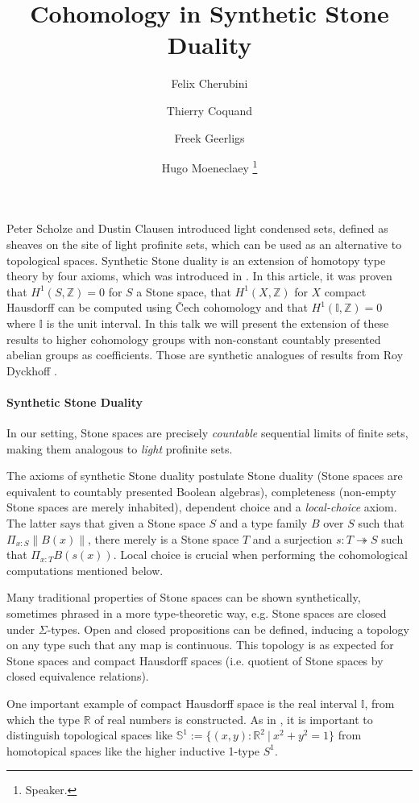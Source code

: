 \documentclass[letterpaper]{../util/easychair}
\title{Cohomology in Synthetic Stone Duality 
}
\author{
Felix Cherubini %
\and 
 Thierry Coquand%
\and 
 Freek Geerligs%
\and
 Hugo Moeneclaey %
\thanks{Speaker.}%
}
\institute{
  University of Gothenburg and Chalmers University of Technology, Gothenburg, Sweden%
}
\newcommand{\R}{\mathbb{R}}
\newcommand{\Z}{\mathbb{Z}}
\newcommand{\I}{\mathbb{I}}
\newcommand{\bS}{\mathbb{S}}
\begin{document}
\maketitle
Peter Scholze and Dustin Clausen \cite{Scholze} introduced light condensed sets, defined as sheaves on the site of light profinite sets, which can be used as an alternative to topological spaces. 
Synthetic Stone duality is an extension of homotopy type theory by four axioms, which was introduced in \cite{synthetic-stone-duality}. In this article, it was proven that $H^1(S,\Z) = 0$ for $S$ a Stone space, that $H^1(X,\Z)$ for $X$ compact Hausdorff can be computed using \v{C}ech cohomology and that $H^1(\mathbb{I},\Z) = 0$ where $\mathbb{I}$ is the unit interval. In this talk we will present the extension of these results to higher cohomology groups with non-constant countably presented abelian groups as coefficients. Those are synthetic analogues of results from Roy Dyckhoff \cite{dyckhoff76,dyckhoff76-1}.

\paragraph*{Synthetic Stone Duality}

In our setting, Stone spaces are precisely \emph{countable} sequential limits of finite sets, making them analogous to \emph{light} profinite sets. 

The axioms of synthetic Stone duality postulate Stone duality (Stone spaces are equivalent to countably presented Boolean algebras), completeness (non-empty Stone spaces are merely inhabited), dependent choice and a \emph{local-choice} axiom. The latter says that given a Stone space $S$ and a type family $B$ over $S$ such that $\Pi_{x:S} \| B(x)  \|$, there merely is a Stone space $T$ and a surjection $s:T\twoheadrightarrow S$ such that $\Pi_{x:T} B(s(x))$. Local choice is crucial when performing the cohomological computations mentioned below.

Many traditional properties of Stone spaces can be shown synthetically, sometimes phrased in a more type-theoretic way, e.g. Stone spaces are closed under $\Sigma$-types. Open and closed propositions can be defined, inducing a topology on any type such that any map is continuous. This topology is as expected for Stone spaces and compact Hausdorff spaces (i.e. quotient of Stone spaces by closed equivalence relations).

One important example of compact Hausdorff space is the real interval $\I$, from which the type $\R$  of real numbers is constructed.
As in \cite{shulman-Brouwer-fixed-point}, it is important to distinguish topological spaces like $\bS^1:=\{(x,y):\R^2\ \vert\ x^2+y^2=1\}$ from homotopical spaces like the higher inductive 1-type $S^1$.
\end{document}
